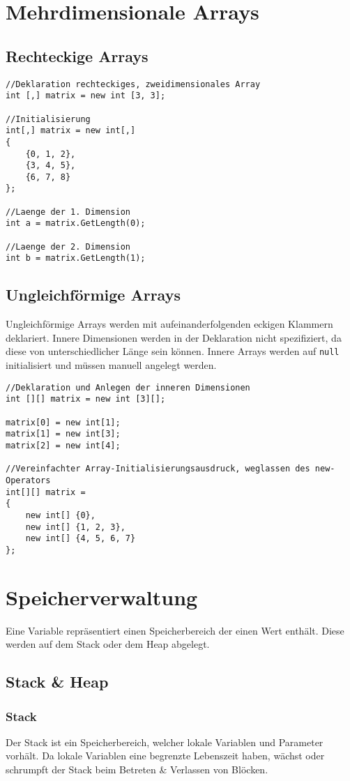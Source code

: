 \section{Mehrdimensionale Arrays}
\subsection{Rechteckige Arrays}
\begin{lstlisting}
//Deklaration rechteckiges, zweidimensionales Array
int [,] matrix = new int [3, 3];

//Initialisierung
int[,] matrix = new int[,]
{
	{0, 1, 2},
	{3, 4, 5},
	{6, 7, 8}
};

//Laenge der 1. Dimension
int a = matrix.GetLength(0);

//Laenge der 2. Dimension
int b = matrix.GetLength(1);

\end{lstlisting}
\subsection{Ungleichförmige Arrays}
Ungleichförmige Arrays werden mit aufeinanderfolgenden eckigen Klammern deklariert. Innere Dimensionen werden in der Deklaration nicht spezifiziert, da diese von unterschiedlicher Länge sein können. Innere Arrays werden auf \texttt{null} initialisiert und müssen manuell angelegt werden.
\begin{lstlisting}
//Deklaration und Anlegen der inneren Dimensionen
int [][] matrix = new int [3][];

matrix[0] = new int[1];
matrix[1] = new int[3];
matrix[2] = new int[4];

//Vereinfachter Array-Initialisierungsausdruck, weglassen des new-Operators
int[][] matrix =
{
	new int[] {0},
	new int[] {1, 2, 3},
	new int[] {4, 5, 6, 7}
};

\end{lstlisting}
\section{Speicherverwaltung}
Eine Variable repräsentiert einen Speicherbereich der einen Wert enthält. Diese werden auf dem Stack oder dem Heap abgelegt.
\subsection{Stack \& Heap}
\subsubsection{Stack}
Der Stack ist ein Speicherbereich, welcher lokale Variablen und Parameter vorhält. Da lokale Variablen eine begrenzte Lebenszeit haben, wächst oder schrumpft der Stack beim Betreten \& Verlassen von Blöcken.
